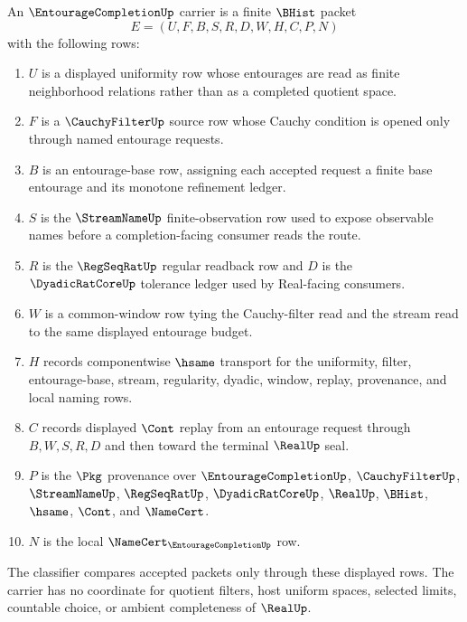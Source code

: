 \begin{definition}
\label{def:entourage-completion-carrier}
An $\EntourageCompletionUp$ carrier is a finite $\BHist$ packet
$$
E=(U,F,B,S,R,D,W,H,C,P,N)
$$
with the following rows:
\begin{enumerate}
\item $U$ is a displayed uniformity row whose entourages are read as finite
neighborhood relations rather than as a completed quotient space.
\item $F$ is a $\CauchyFilterUp$ source row whose Cauchy condition is opened
only through named entourage requests.
\item $B$ is an entourage-base row, assigning each accepted request a finite
base entourage and its monotone refinement ledger.
\item $S$ is the $\StreamNameUp$ finite-observation row used to expose
observable names before a completion-facing consumer reads the route.
\item $R$ is the $\RegSeqRatUp$ regular readback row and $D$ is the
$\DyadicRatCoreUp$ tolerance ledger used by Real-facing consumers.
\item $W$ is a common-window row tying the Cauchy-filter read and the stream
read to the same displayed entourage budget.
\item $H$ records componentwise $\hsame$ transport for the uniformity, filter,
entourage-base, stream, regularity, dyadic, window, replay, provenance, and
local naming rows.
\item $C$ records displayed $\Cont$ replay from an entourage request through
$B,W,S,R,D$ and then toward the terminal $\RealUp$ seal.
\item $P$ is the $\Pkg$ provenance over $\EntourageCompletionUp$,
$\CauchyFilterUp$, $\StreamNameUp$, $\RegSeqRatUp$, $\DyadicRatCoreUp$,
$\RealUp$, $\BHist$, $\hsame$, $\Cont$, and $\NameCert$.
\item $N$ is the local $\NameCert_{\EntourageCompletionUp}$ row.
\end{enumerate}
The classifier compares accepted packets only through these displayed rows.
The carrier has no coordinate for quotient filters, host uniform spaces,
selected limits, countable choice, or ambient completeness of $\RealUp$.
\end{definition}

